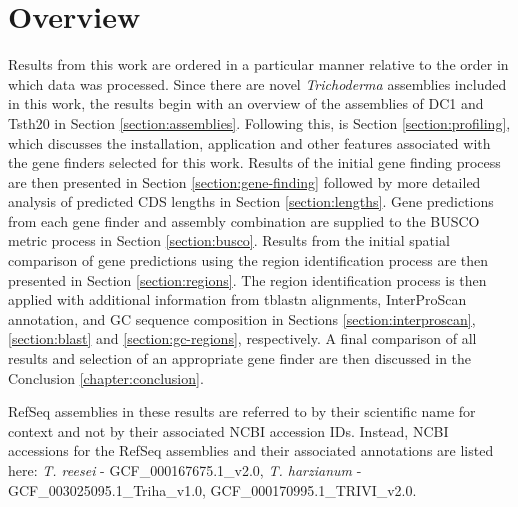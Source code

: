 \section{Overview}

Results from this work are ordered in a particular manner relative to
the order in which data was processed. Since there are novel
\textit{Trichoderma} assemblies included in this work, the results
begin with an overview of the assemblies of DC1 and Tsth20 in Section
\ref{section:assemblies}. Following this, is Section
\ref{section:profiling}, which discusses the installation, application
and other features associated with the gene finders selected for this
work. Results of the initial gene finding process are then presented
in Section \ref{section:gene-finding} followed by more detailed
analysis of predicted CDS lengths in Section
\ref{section:lengths}. Gene predictions from each gene finder and
assembly combination are supplied to the BUSCO metric process in
Section \ref{section:busco}. Results from the initial spatial
comparison of gene predictions using the region identification process
are then presented in Section \ref{section:regions}. The region
identification process is then applied with additional information
from tblastn alignments, InterProScan annotation, and GC sequence
composition in Sections \ref{section:interproscan},
\ref{section:blast} and \ref{section:gc-regions}, respectively. A
final comparison of all results and selection of an appropriate gene
finder are then discussed in the Conclusion \ref{chapter:conclusion}.

RefSeq assemblies in these results are referred to by their scientific
name for context and not by their associated NCBI accession
IDs. Instead, NCBI accessions for the RefSeq assemblies and their
associated annotations are listed here: \textit{T. reesei} -
GCF\_000167675.1\_v2.0, \textit{T. harzianum} -
GCF\_003025095.1\_Triha\_v1.0, GCF\_000170995.1\_TRIVI\_v2.0.
